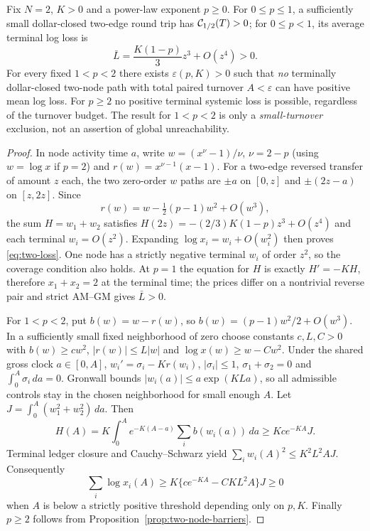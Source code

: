\documentclass[review,hidelinks,onefignum,onetabnum]{siamonline250211}%
\begin{document}
\begin{theorem}\label{thm:two-local}
Fix $N=2$, $K>0$ and a power-law exponent $p\ge0$.
For $0\le p\le1$, a sufficiently small dollar-closed two-edge
round trip has $\mathcal{C}_{1/2}(T)>0$; for $0\le p<1$,
its average terminal log loss is
\begin{equation}\label{eq:two-loss}
 \bar L=\frac{K(1-p)}{3}z^3+O(z^4)>0.
\end{equation}
For every fixed $1<p<2$ there exists $\varepsilon(p,K)>0$
such that \emph{no} terminally dollar-closed two-node path with total
paired turnover $A<\varepsilon$ can have positive mean log loss.
For $p\ge2$ no positive terminal systemic loss is possible, regardless
of the turnover budget. The result for $1<p<2$ is only a
\emph{small-turnover} exclusion, not an assertion of global
unreachability.
\end{theorem}
\begin{proof}
In node activity time $a$, write $w=(x^{\nu}-1)/\nu$,
$\nu=2-p$ (using $w=\log x$ if $p=2$) and
$r(w)=x^{\nu-1}(x-1)$. For a two-edge reversed transfer of
amount $z$ each, the two zero-order $w$ paths are $\pm a$
on $[0,z]$ and $\pm(2z-a)$ on $[z,2z]$. Since
\[
 r(w)=w-\tfrac12(p-1)w^2+O(w^3),
\]
the sum $H=w_1+w_2$ satisfies
$H(2z)=-(2/3)K(1-p)z^3+O(z^4)$ and each
terminal $w_i=O(z^2)$. Expanding $\log x_i=w_i+O(w_i^2)$
then proves \eqref{eq:two-loss}. One node has a strictly negative
terminal $w_i$ of order $z^2$, so the coverage condition also holds.
At $p=1$ the equation for $H$ is exactly $H'=-KH$,
therefore $x_1+x_2=2$ at the terminal time; the prices differ
on a nontrivial reverse pair and strict AM--GM gives $\bar L>0$.

For $1<p<2$, put $b(w)=w-r(w)$, so
$b(w)=(p-1)w^2/2+O(w^3)$. In a sufficiently small fixed
neighborhood of zero choose constants $c,L,C>0$ with
$b(w)\ge c w^2$, $|r(w)|\le L|w|$ and
$\log x(w)\ge w-Cw^2$. Under the shared gross clock $a\in[0,A]$,
$w_i'=\sigma_i-Kr(w_i)$, $|\sigma_i|\le1$,
$\sigma_1+\sigma_2=0$ and $\int_0^A\sigma_i\,da=0$.
Gronwall bounds $|w_i(a)|\le a\exp(KLa)$, so all admissible
controls stay in the chosen neighborhood for small enough $A$.
Let $J=\int_0^A(w_1^2+w_2^2)\,da$. Then
\[
 H(A)=K\int_0^A e^{-K(A-a)}\sum_i b(w_i(a))\,da
 \ge Kce^{-KA}J.
\]
Terminal ledger closure and Cauchy--Schwarz yield
$\sum_i w_i(A)^2\le K^2L^2AJ$. Consequently
\[
 \sum_i\log x_i(A)\ge
 K\{ce^{-KA}-CKL^2A\}J\ge0
\]
when $A$ is below a strictly positive threshold depending only
on $p,K$. Finally $p\ge2$ follows from Proposition~\ref{prop:two-node-barriers}.
\end{proof}
\end{document}
